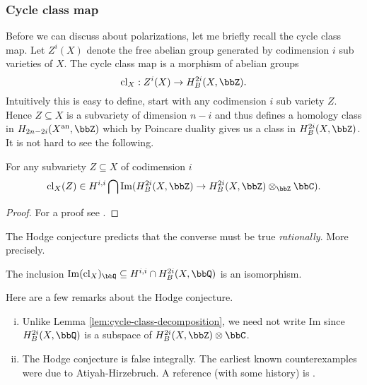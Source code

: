 \documentclass[a4paper,12pt]{book}
\begin{document}
\subsubsection{Cycle class map}
\label{sec:cycle-class-map}

Before we can discuss about polarizations, let me briefly recall the cycle class map. Let $Z^{i}(X)$ denote the free abelian group generated by codimension $i$ sub varieties of $X$. The cycle class map is a morphism of abelian groups 
\[
\mathrm{cl}_{X}: Z^{i}(X) \to H^{2i}_{B}(X,\bbZ).
\]
Intuitively this is easy to define, start with any codimension $i$ sub variety $Z$. Hence $Z \subseteq X$ is a subvariety of dimension $n-i$ and thus defines a homology class in $H_{2n-2i}(X^{\mathrm{an}},\bbZ)$ which by Poincare duality gives us a class in $H^{2i}_{B}(X,\bbZ)$. It is not hard to see the following.

\begin{lem}\label{lem:cycle-class-decomposition}
For any subvariety $Z \subseteq X$ of codimension $i$
\[
\mathrm{cl}_{X}(Z) \in H^{i,i}\bigcap\mathrm{Im}(H^{2i}_{B}(X,\bbZ) \to H^{2i}_{B}(X,\bbZ)\otimes_{\bbZ}\bbC).
\]
\end{lem}

\begin{proof}
For a proof see \cite[Proposition 11.20]{voisinHodgeTheory}.
\end{proof}

The Hodge conjecture predicts that the converse must be true \textit{rationally}. More precisely.

\begin{conj}
\label{conj:Hodge-conjecture}
The inclusion $\mathrm{Im}(\mathrm{cl}_{X})_{\bbQ} \subseteq H^{i,i}\cap H^{2i}_{B}(X,\bbQ)$ is an isomorphism.   
\end{conj}

\begin{rem}\label{rem:Hodge-conjecture}
Here are a few remarks about the Hodge conjecture.
\begin{enumerate}[(i)]
\item Unlike Lemma \ref{lem:cycle-class-decomposition}, we need not write $\mathrm{Im}$ since $H^{2i}_{B}(X,\bbQ)$ is a subspace of $H^{2i}_{B}(X,\bbZ) \otimes \bbC$.

\item The Hodge conjecture is false integrally. The earliest known counterexamples were due to Atiyah-Hirzebruch. A reference (with some history) is \cite{soule2005torsion}.

\end{enumerate}
\end{rem}
\end{document}
